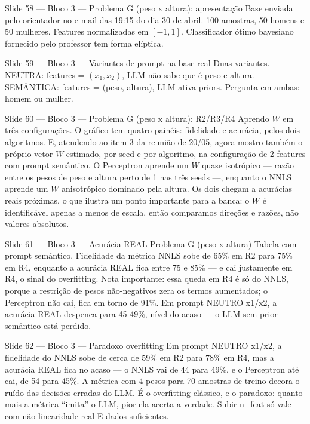 \documentclass[aspectratio=169,10pt]{beamer}
\begin{document}
\begin{frame}{Slide 58 --- Bloco 3 --- Problema G (peso x altura): apresenta\c{c}\~ao}
\footnotesize
Base enviada pelo orientador no e-mail das 19:15 do dia 30 de abril. 100 amostras, 50 homens e 50 mulheres. Features normalizadas em $[-1, 1]$. Classificador \'otimo bayesiano fornecido pelo professor tem forma el\'iptica.
\end{frame}

\begin{frame}{Slide 59 --- Bloco 3 --- Variantes de prompt na base real}
\footnotesize
Duas variantes. NEUTRA: features = $(x_1, x_2)$, LLM n\~ao sabe que \'e peso e altura. SEM\^ANTICA: features = (peso, altura), LLM ativa priors. Pergunta em ambas: homem ou mulher.
\end{frame}

\begin{frame}{Slide 60 --- Bloco 3 --- Problema G (peso x altura): R2/R3/R4}
\footnotesize
Aprendo $W$ em tr\^es configura\c{c}\~oes. O gr\'afico tem quatro pain\'eis: fidelidade e acur\'acia, pelos dois algoritmos. E, atendendo ao item 3 da reuni\~ao de 20/05, agora mostro tamb\'em o pr\'oprio vetor $W$ estimado, por seed e por algoritmo, na configura\c{c}\~ao de 2 features com prompt sem\^antico. O Perceptron aprende um $W$ quase isotr\'opico --- raz\~ao entre os pesos de peso e altura perto de 1 nas tr\^es seeds ---, enquanto o NNLS aprende um $W$ anisotr\'opico dominado pela altura. Os dois chegam a acur\'acias reais pr\'oximas, o que ilustra um ponto importante para a banca: o $W$ \'e identific\'avel apenas a menos de escala, ent\~ao comparamos dire\c{c}\~oes e raz\~oes, n\~ao valores absolutos.
\end{frame}

\begin{frame}{Slide 61 --- Bloco 3 --- Acur\'acia REAL Problema G (peso x altura)}
\footnotesize
Tabela com prompt sem\^antico. Fidelidade da m\'etrica NNLS sobe de 65\% em R2 para 75\% em R4, enquanto a acur\'acia REAL fica entre 75 e 85\% --- e cai justamente em R4, o sinal do overfitting. Nota importante: essa queda em R4 \'e s\'o do NNLS, porque a restri\c{c}\~ao de pesos n\~ao-negativos zera os termos aumentados; o Perceptron n\~ao cai, fica em torno de 91\%. Em prompt NEUTRO x1/x2, a acur\'acia REAL despenca para 45-49\%, n\'ivel do acaso --- o LLM sem prior sem\^antico est\'a perdido.
\end{frame}

\begin{frame}{Slide 62 --- Bloco 3 --- Paradoxo overfitting}
\footnotesize
Em prompt NEUTRO x1/x2, a fidelidade do NNLS sobe de cerca de 59\% em R2 para 78\% em R4, mas a acur\'acia REAL fica no acaso --- o NNLS vai de 44 para 49\%, e o Perceptron at\'e cai, de 54 para 45\%. A m\'etrica com 4 pesos para 70 amostras de treino decora o ru\'ido das decis\~oes erradas do LLM. \'E o overfitting cl\'assico, e o paradoxo: quanto mais a m\'etrica ``imita'' o LLM, pior ela acerta a verdade. Subir n\_feat s\'o vale com n\~ao-linearidade real E dados suficientes.
\end{frame}
\end{document}
